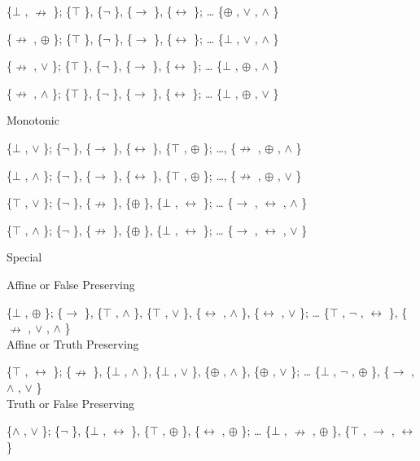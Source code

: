 \{$\bot$ , $\nrightarrow$ \}; \{$\top$ \}, \{$\neg$ \}, \{$\to$ \}, \{$\leftrightarrow$ \}; \ldots{} \{$\oplus$ , $\lor$ , $\land$ \}

\{$\nrightarrow$ , $\oplus$ \}; \{$\top$ \}, \{$\neg$ \}, \{$\to$ \}, \{$\leftrightarrow$ \}; \ldots{} \{$\bot$ , $\lor$ , $\land$ \}

\{$\nrightarrow$ , $\lor$ \}; \{$\top$ \}, \{$\neg$ \}, \{$\to$ \}, \{$\leftrightarrow$ \}; \ldots{} \{$\bot$ , $\oplus$ , $\land$ \}

\{$\nrightarrow$ , $\land$ \}; \{$\top$ \}, \{$\neg$ \}, \{$\to$ \}, \{$\leftrightarrow$ \}; \ldots{} \{$\bot$ , $\oplus$ , $\lor$ \}

\protect\hypertarget{anchor-12}{}{}Monotonic

\{$\bot$ , $\lor$ \}; \{$\neg$ \}, \{$\to$ \}, \{$\leftrightarrow$ \}, \{$\top$ , $\oplus$ \}; \ldots, \{$\nrightarrow$ , $\oplus$ , $\land$ \}

\{$\bot$ , $\land$ \}; \{$\neg$ \}, \{$\to$ \}, \{$\leftrightarrow$ \}, \{$\top$ , $\oplus$ \}; \ldots, \{$\nrightarrow$ , $\oplus$ , $\lor$ \}

\{$\top$ , $\lor$ \}; \{$\neg$ \}, \{$\nrightarrow$ \}, \{$\oplus$ \}, \{$\bot$ , $\leftrightarrow$ \}; \ldots{} \{$\to$ , $\leftrightarrow$ , $\land$ \}

\{$\top$ , $\land$ \}; \{$\neg$ \}, \{$\nrightarrow$ \}, \{$\oplus$ \}, \{$\bot$ , $\leftrightarrow$ \}; \ldots{} \{$\to$ , $\leftrightarrow$ , $\lor$ \}

\protect\hypertarget{anchor-13}{}{}Special

Affine or False Preserving

\{$\bot$ , $\oplus$ \}; \{$\to$ \}, \{$\top$ , $\land$ \}, \{$\top$ , $\lor$ \}, \{$\leftrightarrow$ , $\land$ \}, \{$\leftrightarrow$ , $\lor$ \}; \ldots{} \{$\top$ ,
$\neg$ , $\leftrightarrow$ \}, \{$\nrightarrow$ , $\lor$ , $\land$ \}\\
Affine or Truth Preserving

\{$\top$ , $\leftrightarrow$ \}; \{$\nrightarrow$ \}, \{$\bot$ , $\land$ \}, \{$\bot$ , $\lor$ \}, \{$\oplus$ , $\land$ \}, \{$\oplus$ , $\lor$ \}; \ldots{} \{$\bot$ ,
$\neg$ , $\oplus$ \}, \{$\to$ , $\land$ , $\lor$ \}\\
Truth or False Preserving

\{$\land$ , $\lor$ \}; \{$\neg$ \}, \{$\bot$ , $\leftrightarrow$ \}, \{$\top$ , $\oplus$ \}, \{$\leftrightarrow$ , $\oplus$ \}; \ldots{} \{$\bot$ , $\nrightarrow$ , $\oplus$ \},
\{$\top$ , $\to$ , $\leftrightarrow$ \}

